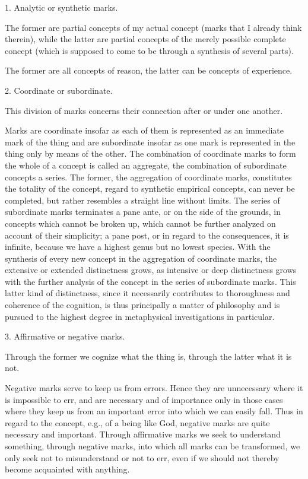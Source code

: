     1. Analytic or synthetic marks.

    The former are partial concepts of my actual concept
    (marks that I already think therein),
    while the latter are partial concepts of
    the merely possible complete concept
    (which is supposed to come to be
    through a synthesis of several parts).

    The former are all concepts of reason,
    the latter can be concepts of experience.

    2. Coordinate or subordinate.

    This division of marks concerns
    their connection after or under one another.

    Marks are coordinate insofar as each of them is
    represented as an immediate mark of the thing
    and are subordinate insofar as one mark is
    represented in the thing only by means of the other.
    The combination of coordinate marks to form
    the whole of a concept is called an aggregate,
    the combination of subordinate concepts a series.
    The former, the aggregation of coordinate marks,
    constitutes the totality of the concept,
    regard to synthetic empirical concepts, can never be completed,
    but rather resembles a straight line without limits.
    The series of subordinate marks terminates a pane ante,
    or on the side of the grounds, in concepts which cannot be broken up,
    which cannot be further analyzed on account of their simplicity;
    a pane post, or in regard to the consequences, it is infinite,
    because we have a highest genus but no lowest species.
    With the synthesis of every new concept in the aggregation of coordinate marks,
    the extensive or extended distinctness grows,
    as intensive or deep distinctness grows with the further
    analysis of the concept in the series of subordinate marks.
    This latter kind of distinctness, since it necessarily
    contributes to thoroughness and coherence of the cognition,
    is thus principally a matter of philosophy and is pursued
    to the highest degree in metaphysical investigations in particular.

    3. Affirmative or negative marks.

    Through the former we cognize what the thing is,
    through the latter what it is not.

    Negative marks serve to keep us from errors.
    Hence they are unnecessary where it is impossible to err,
    and are necessary and of importance only in
    those cases where they keep us from an important error
    into which we can easily fall.
    Thus in regard to the concept, e.g., of a being like God,
    negative marks are quite necessary and important.
    Through affirmative marks we seek to understand something,
    through negative marks, into which all marks can be transformed,
    we only seek not to misunderstand or not to err,
    even if we should not thereby become acquainted with anything.

